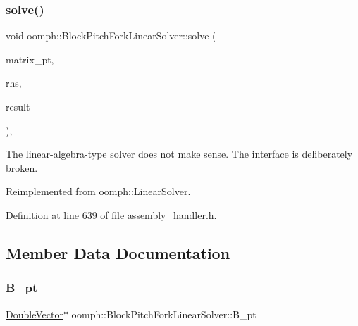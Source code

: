 \subsubsection{\texorpdfstring{solve()}{solve()}\hspace{0.1cm}{\footnotesize\ttfamily [3/3]}}
{\footnotesize\ttfamily void oomph\+::\+Block\+Pitch\+Fork\+Linear\+Solver\+::solve (\begin{DoxyParamCaption}\item[{\hyperlink{classoomph_1_1DoubleMatrixBase}{Double\+Matrix\+Base} $\ast$const \&}]{matrix\+\_\+pt,  }\item[{const \hyperlink{classoomph_1_1Vector}{Vector}$<$ double $>$ \&}]{rhs,  }\item[{\hyperlink{classoomph_1_1Vector}{Vector}$<$ double $>$ \&}]{result }\end{DoxyParamCaption})\hspace{0.3cm}{\ttfamily [inline]}, {\ttfamily [virtual]}}



The linear-\/algebra-\/type solver does not make sense. The interface is deliberately broken. 



Reimplemented from \hyperlink{classoomph_1_1LinearSolver_a1f7a2ee2cd18d3dafc20a61ca2f52dbb}{oomph\+::\+Linear\+Solver}.



Definition at line 639 of file assembly\+\_\+handler.\+h.



\subsection{Member Data Documentation}
\mbox{\label{classoomph_1_1BlockPitchForkLinearSolver_a4e88432fbf8e7cdefbfbd2c67860505e}} 
\subsubsection{\texorpdfstring{B\+\_\+pt}{B\_pt}}
{\footnotesize\ttfamily \hyperlink{classoomph_1_1DoubleVector}{Double\+Vector}$\ast$ oomph\+::\+Block\+Pitch\+Fork\+Linear\+Solver\+::\+B\+\_\+pt\hspace{0.3cm}{\ttfamily [private]}}



